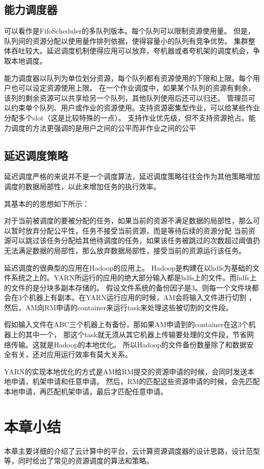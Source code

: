 \subsection{能力调度器}
可以看作是FifoScheduler的多队列版本。每个队列可以限制资源使用量。
但是，队列间的资源分配以使用量作排列依据，使得容量小的队列有竞争优势。
集群整体吞吐较大。延迟调度机制使得应用可以放弃，夸机器或者夸机架的调度机会，争取本地调度。

能力调度器以队列为单位划分资源，每个队列都有资源使用的下限和上限。每个用户也可以设定资源使用上限。
在一个作业调度中，如果某个队列的资源有剩余，该列的剩余资源可以共享给另一个队列，其他队列使用后还可以归还。
管理员可以约束单个队列、用户或作业的资源使用。支持资源密集型作业，可以给某些作业分配多个slot（这是比较特殊的一点）。
支持作业优先级，但不支持资源抢占。能力调度的方法更强调的是用户之间的公平而非作业之间的公平
\subsection{延迟调度策略}
延迟调度严格的来说并不是一个调度算法，延迟调度策略往往会作为其他策略增加调度的数据局部性，以此来增加任务的执行效率。

其基本的的思想如下所示：

对于当前被调度的要被分配的任务，如果当前的资源不满足数据的局部性，那么可以暂时放弃分配公平性，任务不接受当前资源，而是等待后续的资源分配
当前资源可以跳过该任务分配给其他待调度的任务，如果该任务被跳过的次数超过阈值扔无法满足数据的局部性，那么放弃数据局部性，接受当前的资源运行该任务。

延迟调度的很典型的应用在Hadoop的应用上。
Hadoop是构建在以hdfs为基础的文件系统之上的。YARN所运行的应用的绝大部分输入都是hdfs上的文件。而hdfs上的文件的是分块多副本存储的。
假设文件系统的备份因子是3。则每一个文件块都会在3个机器上有副本。在YARN运行应用的时候，AM会将输入文件进行切割
，然后，AM向RM申请的container来运行task来处理这些被切割的文件段。

假如输入文件在ABC三个机器上有备份，那如果AM申请到的container在这3个机器上的其中一个，
那这个task就无须从其它机器上传输要处理的文件段，节省网络传输。这就是Hadoop的本地优化。
所以Hadoop的文件备份数量除了和数据安全有关，还对应用运行效率有莫大关系。

YARN的实现本地优化的方式是AM给RM提交的资源申请的时候，会同时发送本地申请，机架申请和任意申请。
然后，RM的匹配这些资源申请的时候，会先匹配本地申请，再匹配机架申请，最后才匹配任意申请。

\section{本章小结}
本章主要详细的介绍了云计算中的平台，云计算资源调度器的设计思路，设计范型等，同时给出了常见的资源调度的算法和策略。
